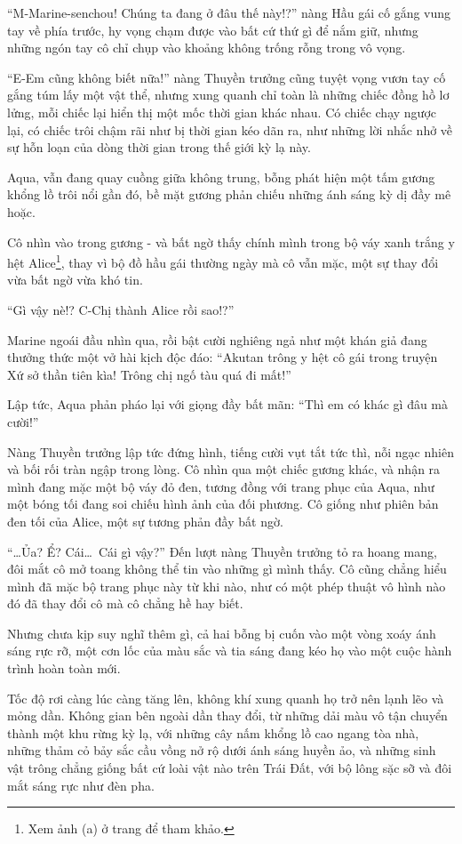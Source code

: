 \documentclass[../main.tex]{subfiles}
\begin{document}
``M-Marine-senchou! Chúng ta đang ở đâu thế này!?'' nàng Hầu gái cố gắng vung tay về phía trước, hy vọng chạm được vào bất cứ thứ gì để nắm giữ, nhưng những ngón tay cô chỉ chụp vào khoảng không trống rỗng trong vô vọng.

``E-Em cũng không biết nữa!'' nàng Thuyền trưởng cũng tuyệt vọng vươn tay cố gắng túm lấy một vật thể, nhưng xung quanh chỉ toàn là những chiếc đồng hồ lơ lửng, mỗi chiếc lại hiển thị một mốc thời gian khác nhau. Có chiếc chạy ngược lại, có chiếc trôi chậm rãi như bị thời gian kéo dãn ra, như những lời nhắc nhở về sự hỗn loạn của dòng thời gian trong thế giới kỳ lạ này.

Aqua, vẫn đang quay cuồng giữa không trung, bỗng phát hiện một tấm gương khổng lồ trôi nổi gần đó, bề mặt gương phản chiếu những ánh sáng kỳ dị đầy mê hoặc.

Cô nhìn vào trong gương - và bất ngờ thấy chính mình trong bộ váy xanh trắng y hệt Alice\footnote{Xem ảnh (a) ở trang \pageref{wonderland} để tham khảo.}, thay vì bộ đồ hầu gái thường ngày mà cô vẫn mặc, một sự thay đổi vừa bất ngờ vừa khó tin.

``Gì vậy nè!? C-Chị thành Alice rồi sao!?''

Marine ngoái đầu nhìn qua, rồi bật cười nghiêng ngả như một khán giả đang thưởng thức một vở hài kịch độc đáo: ``Akutan trông y hệt cô gái trong truyện Xứ sở thần tiên kìa! Trông chị ngố tàu quá đi mất!''

Lập tức, Aqua phản pháo lại với giọng đầy bất mãn: ``Thì em có khác gì đâu mà cười!''

Nàng Thuyền trưởng lập tức đứng hình, tiếng cười vụt tắt tức thì, nỗi ngạc nhiên và bối rối tràn ngập trong lòng. Cô nhìn qua một chiếc gương khác, và nhận ra mình đang mặc một bộ váy đỏ đen, tương đồng với trang phục của Aqua, như một bóng tối đang soi chiếu hình ảnh của đối phương. Cô giống như phiên bản đen tối của Alice, một sự tương phản đầy bất ngờ.

``\dots Ủa? Ể? Cái\dots\ Cái gì vậy?'' Đến lượt nàng Thuyền trưởng tỏ ra hoang mang, đôi mắt cô mở toang không thể tin vào những gì mình thấy. Cô cũng chẳng hiểu mình đã mặc bộ trang phục này từ khi nào, như có một phép thuật vô hình nào đó đã thay đổi cô mà cô chẳng hề hay biết.

Nhưng chưa kịp suy nghĩ thêm gì, cả hai bỗng bị cuốn vào một vòng xoáy ánh sáng rực rỡ, một cơn lốc của màu sắc và tia sáng đang kéo họ vào một cuộc hành trình hoàn toàn mới.

Tốc độ rơi càng lúc càng tăng lên, không khí xung quanh họ trở nên lạnh lẽo và mỏng dần. Không gian bên ngoài dần thay đổi, từ những dải màu vô tận chuyển thành một khu rừng kỳ lạ, với những cây nấm khổng lồ cao ngang tòa nhà, những thảm cỏ bảy sắc cầu vồng nở rộ dưới ánh sáng huyền ảo, và những sinh vật trông chẳng giống bất cứ loài vật nào trên Trái Đất, với bộ lông sặc sỡ và đôi mắt sáng rực như đèn pha.
\end{document}
